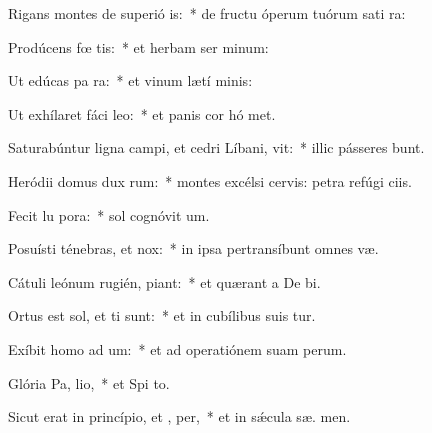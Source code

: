 \item Rigans montes de superió is:~* de fructu óperum tuórum sati ra:
\item Prodúcens fœ tis:~* et herbam ser minum:
\item Ut edúcas pa  ra:~* et vinum lætí  minis:
\item Ut exhílaret fáci  leo:~* et panis cor hó met.
\item Saturabúntur ligna campi, et cedri Líbani,  vit:~* illic pásseres bunt.
\item Heródii domus dux  rum:~* montes excélsi cervis: petra refúgi ciis.
\item Fecit lu  pora:~* sol cognóvit  um.
\item Posuísti ténebras, et   nox:~* in ipsa pertransíbunt omnes  væ.
\item Cátuli leónum rugién,  piant:~* et quærant a De  bi.
\item Ortus est sol, et ti sunt:~* et in cubílibus suis tur.
\item Exíbit homo ad  um:~* et ad operatiónem suam   perum.
\item Glória Pa,  lio,~* et Spi to.
\item Sicut erat in princípio, et ,  per,~* et in sǽcula sæ. men.
